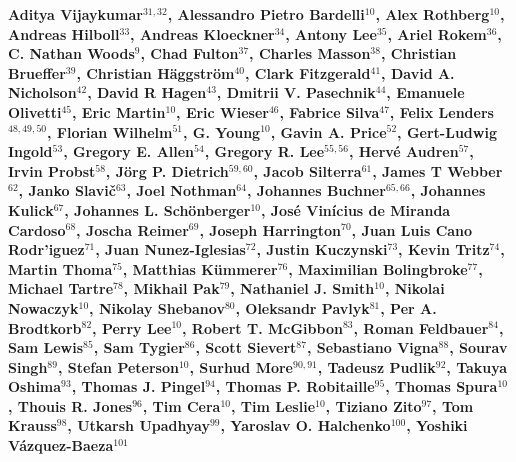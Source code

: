 
{\bf
Aditya Vijaykumar$^{31,32}$, Alessandro Pietro Bardelli$^{10}$, Alex Rothberg$^{10}$, Andreas Hilboll$^{33}$, Andreas Kloeckner$^{34}$, Antony Lee$^{35}$, Ariel Rokem$^{36}$, C. Nathan Woods$^{9}$, Chad Fulton$^{37}$, Charles Masson$^{38}$, Christian Brueffer$^{39}$, Christian H\"aggstr\"om$^{40}$, Clark Fitzgerald$^{41}$, David A. Nicholson$^{42}$, David R Hagen$^{43}$, Dmitrii V. Pasechnik$^{44}$, Emanuele Olivetti$^{45}$, Eric Martin$^{10}$, Eric Wieser$^{46}$, Fabrice Silva$^{47}$, Felix Lenders$^{48,49,50}$, Florian Wilhelm$^{51}$, G. Young$^{10}$, Gavin A. Price$^{52}$, Gert-Ludwig Ingold$^{53}$, Gregory E. Allen$^{54}$, Gregory R. Lee$^{55,56}$, Herv\'e Audren$^{57}$, Irvin Probst$^{58}$, J\"org P. Dietrich$^{59,60}$, Jacob Silterra$^{61}$, James T Webber$^{62}$, Janko Slavi\v{c}$^{63}$, Joel Nothman$^{64}$, Johannes Buchner$^{65,66}$, Johannes Kulick$^{67}$, Johannes L. Sch\"{o}nberger$^{10}$, Jos\'e Vin\'icius de Miranda Cardoso$^{68}$, Joscha Reimer$^{69}$, Joseph Harrington$^{70}$, Juan Luis Cano Rodr'iguez$^{71}$, Juan Nunez-Iglesias$^{72}$, Justin Kuczynski$^{73}$, Kevin Tritz$^{74}$, Martin Thoma$^{75}$, Matthias K\"ummerer$^{76}$, Maximilian Bolingbroke$^{77}$, Michael Tartre$^{78}$, Mikhail Pak$^{79}$, Nathaniel J. Smith$^{10}$, Nikolai Nowaczyk$^{10}$, Nikolay Shebanov$^{80}$, Oleksandr Pavlyk$^{81}$, Per A. Brodtkorb$^{82}$, Perry Lee$^{10}$, Robert T. McGibbon$^{83}$, Roman Feldbauer$^{84}$, Sam Lewis$^{85}$, Sam Tygier$^{86}$, Scott Sievert$^{87}$, Sebastiano Vigna$^{88}$, Sourav Singh$^{89}$, Stefan Peterson$^{10}$, Surhud More$^{90,91}$, Tadeusz Pudlik$^{92}$, Takuya Oshima$^{93}$, Thomas J. Pingel$^{94}$, Thomas P. Robitaille$^{95}$, Thomas Spura$^{10}$, Thouis R. Jones$^{96}$, Tim Cera$^{10}$, Tim Leslie$^{10}$, Tiziano Zito$^{97}$, Tom Krauss$^{98}$, Utkarsh Upadhyay$^{99}$, Yaroslav O. Halchenko$^{100}$, Yoshiki V\'azquez-Baeza$^{101}$
}
\newline
\hfill \break
